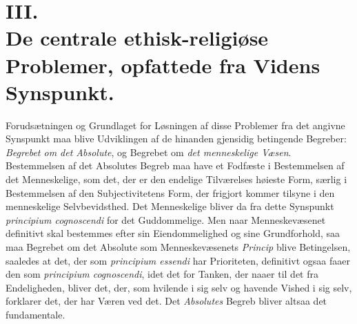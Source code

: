 \chapter*{III.\\ De centrale ethisk-religiøse Problemer, opfattede fra Videns Synspunkt.}

Forudsætningen og Grundlaget for Løsningen af disse Problemer fra det angivne
Synspunkt maa blive Udviklingen af de hinanden gjensidig betingende Begreber:
\emph{Begrebet om det Absolute}, og Begrebet om \emph{det menneskelige Væsen}.
Bestemmelsen af det Absolutes Begreb maa have et Fodfæste i Bestemmelsen af
det Menneskelige, som det, der er den endelige Tilværelses høieste Form,
særlig i Bestemmelsen af den Subjectivitetens Form, der frigjort kommer
tilsyne i den menneskelige Selvbevidsthed. Det Menneskelige bliver da fra
dette Synspunkt \textit{principium cognoscendi} for det Guddommelige. Men naar
Menneskevæsenet definitivt skal bestemmes efter sin Eiendommelighed og sine
Grundforhold, saa maa Begrebet om det Absolute som Menneskevæsenets
\emph{Princip} blive Betingelsen, saaledes at det, der som \textit{principium
essendi} har Prioriteten, definitivt ogsaa faaer den som \textit{principium
cognoscendi}, idet det for Tanken, der naaer til det fra Endeligheden, bliver
det, der, som hvilende i sig selv og havende Vished i sig selv, forklarer det,
der har Væren ved det. Det \emph{Absolutes} Begreb bliver altsaa det
fundamentale.

